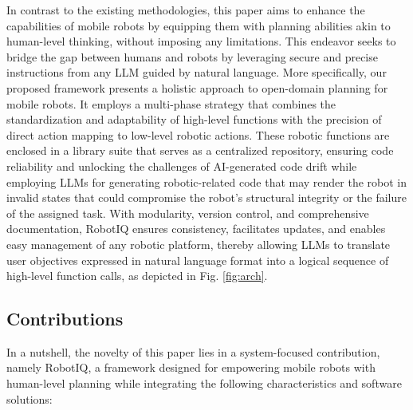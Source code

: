 In contrast to the existing methodologies, this paper aims to enhance the capabilities of mobile robots by equipping them with planning abilities akin to human-level thinking, without imposing any limitations. This endeavor seeks to bridge the gap between humans and robots by leveraging secure and precise instructions from any LLM guided by natural language. More specifically, our proposed framework presents a holistic approach to open-domain planning for mobile robots. It employs a multi-phase strategy that combines the standardization and adaptability of high-level functions with the precision of direct action mapping to low-level robotic actions. These robotic functions are enclosed in a library suite that serves as a centralized repository, ensuring code reliability and unlocking the challenges of AI-generated code drift while employing LLMs for generating robotic-related code that may render the robot in invalid states that could compromise the robot's structural integrity or the failure of the assigned task. With modularity, version control, and comprehensive documentation, RobotIQ ensures consistency, facilitates updates, and enables easy management of any robotic platform, thereby allowing LLMs to translate user objectives expressed in natural language format into a logical sequence of high-level function calls, as depicted in Fig. \ref{fig:arch}.

\subsection{Contributions}
In a nutshell, the novelty of this paper lies in a system-focused contribution, namely RobotIQ, a framework designed for empowering mobile robots with human-level planning while integrating the following characteristics and software solutions:



